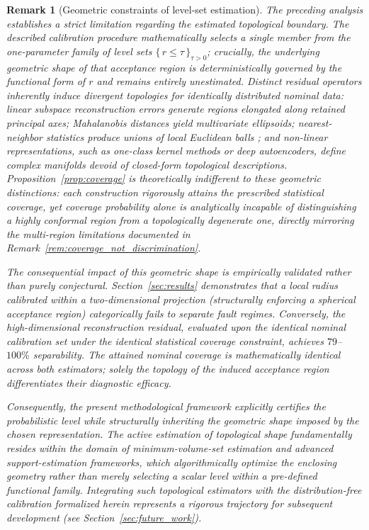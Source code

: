 \documentclass[a4paper]{cas-sc}
\newtheorem{remark}{Remark}
\newcommand{\residual}{\ensuremath{r}}
\begin{document}
\begin{remark}[Geometric constraints of level-set estimation]
\label{rem:level_not_shape}
The preceding analysis establishes a strict limitation regarding the estimated topological boundary. The described calibration procedure mathematically selects a single member from the one-parameter family of level sets \(\{\,\residual\le\tau\,\}_{\tau>0}\); crucially, the underlying geometric \emph{shape} of that acceptance region is deterministically governed by the functional form of \(\residual\) and remains entirely unestimated. Distinct residual operators inherently induce divergent topologies for identically distributed nominal data: linear subspace reconstruction errors generate regions elongated along retained principal axes; Mahalanobis distances yield multivariate ellipsoids; nearest-neighbor statistics produce unions of local Euclidean balls \citep{devroye1980}; and non-linear representations, such as one-class kernel methods \citep{scholkopf2001} or deep autoencoders, define complex manifolds devoid of closed-form topological descriptions. Proposition~\ref{prop:coverage} is theoretically indifferent to these geometric distinctions: each construction rigorously attains the prescribed statistical coverage, yet coverage probability alone is analytically incapable of distinguishing a highly conformal region from a topologically degenerate one, directly mirroring the multi-region limitations documented in Remark~\ref{rem:coverage_not_discrimination}.

The consequential impact of this geometric shape is empirically validated rather than purely conjectural. Section~\ref{sec:results} demonstrates that a local radius calibrated within a two-dimensional projection (structurally enforcing a spherical acceptance region) categorically fails to separate fault regimes. Conversely, the high-dimensional reconstruction residual, evaluated upon the identical nominal calibration set under the identical statistical coverage constraint, achieves \(79\)--\(100\%\) separability. The attained nominal coverage is mathematically identical across both estimators; solely the topology of the induced acceptance region differentiates their diagnostic efficacy.

Consequently, the present methodological framework explicitly certifies the probabilistic level while structurally inheriting the geometric shape imposed by the chosen representation. The active estimation of topological shape fundamentally resides within the domain of minimum-volume-set estimation \citep{scott2006} and advanced support-estimation frameworks, which algorithmically optimize the enclosing geometry rather than merely selecting a scalar level within a pre-defined functional family. Integrating such topological estimators with the distribution-free calibration formalized herein represents a rigorous trajectory for subsequent development (see Section~\ref{sec:future_work}).
\end{remark}
\end{document}
